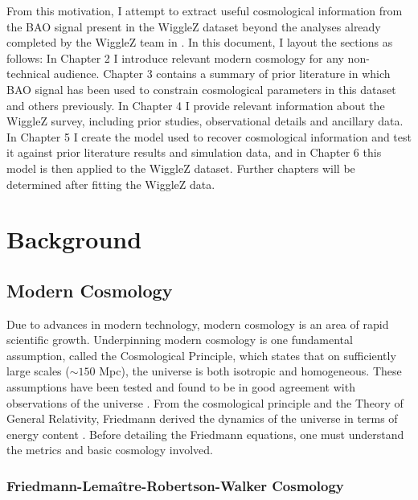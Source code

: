 \documentclass[titlesmallcaps, examinerscopy, copyrightpage]{uqthesis}
\newcommand{\green}{\color{LimeGreen}}
\begin{document}
From this motivation, I attempt to extract useful cosmological information from the BAO signal present in the WiggleZ dataset \citep[WiggleZ;][]{Drinkwater2010} beyond the analyses already completed by the WiggleZ team in \citet{BlakeDavis2011, BlakeKazin2011, BlakeBroughColless2011, BlakeGlazebrook2011, Parkinson2012}. In this document, I layout the sections as follows: In Chapter 2 I introduce relevant modern cosmology for any non-technical audience. Chapter 3 contains a summary of prior literature in which BAO signal has been used to constrain cosmological parameters in this dataset and others previously. In Chapter 4 I provide relevant information about the WiggleZ survey, including prior studies, observational details and ancillary data. In Chapter 5 I create the model used to recover cosmological information and test it against prior literature results and simulation data, and in Chapter 6 this model is then applied to the WiggleZ dataset. {\green Further chapters will be determined after fitting the WiggleZ data.}







\chapter{Background}
\label{ch:back}

\section{Modern Cosmology}

Due to advances in modern technology, modern cosmology is an area of rapid scientific growth. Underpinning modern cosmology is one fundamental assumption, called the Cosmological Principle, which states that on sufficiently large scales ($\sim 150$ Mpc), the universe is both isotropic and homogeneous. These assumptions have been tested and found to be in good agreement with observations of the universe \citep{ScrimgeourDavis2012, HoggEisenstein2005, HansenBanday2004,SchwarzBacon2015,Lahav2001}. From the cosmological principle and the Theory of General Relativity, Friedmann derived the dynamics of the universe in terms of energy content \citep{RydenPeterson2010}. Before detailing the Friedmann equations, one must understand the metrics and basic cosmology involved.

\subsection{Friedmann-Lema\^itre-Robertson-Walker Cosmology} \label{sec:frw}
\end{document}
